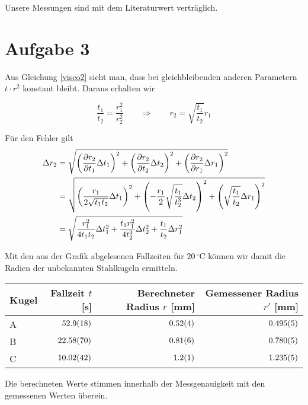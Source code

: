 \documentclass[a4paper,german,12pt,smallheadings]{scrartcl}
\begin{document}
Unsere Messungen sind mit dem Literaturwert verträglich.

\section*{Aufgabe 3}

Aus Gleichung \ref{visco2} sieht man, dass bei gleichbleibenden anderen
Parametern $t \cdot r^2$ konstant bleibt. Daraus erhalten wir

\begin{equation}
  \frac{t_1}{t_2} = \frac{r_1^2}{r_2^2} \qquad \Rightarrow \qquad r_2 = \sqrt{\frac{t_1}{t_2}} r_1
\end{equation}

Für den Fehler gilt
\begin{align*}
  \Delta r_2 &= \sqrt{
    \del{\frac{\partial r_2}{\partial t_1} \Delta t_1}^2 +
    \del{\frac{\partial r_2}{\partial t_2} \Delta t_2}^2 +
    \del{\frac{\partial r_2}{\partial r_1} \Delta r_1}^2
  } \\
  &= \sqrt{
    \del{ \frac{r_1}{2 \sqrt{t_1 t_2}} \Delta t_1 }^2 +
    \del{ -\frac{r_1}{2} \sqrt{ \frac{t_1}{t_2^3}} \Delta t_2 }^2 +
    \del{ \sqrt{ \frac{t_1}{t_2}} \Delta r_1 }^2
  } \\
  &= \sqrt{
    \frac{r_1^2}{4 t_1 t_2} \Delta t_1^2 + \frac{t_1 r_1^2}{4 t_2^3} \Delta t_2^2 + \frac{t_1}{t_2} \Delta r_1^2
  }
\end{align*}

Mit den aus der Grafik abgelesenen Fallzeiten für $20\,^{\circ} \mathrm{C}$
können wir damit die Radien der unbekannten Stahlkugeln ermitteln.

\vspace{0.5cm}
\begin{tabular}{l|r|r|r}
  Kugel & Fallzeit $t$ [s] & Berechneter Radius $r$ [mm] & Gemessener Radius $r'$ [mm] \\
  \hline
  A & $\num{52.9+-1.8}$   & $\num{0.52+-0.04}$ & $\num{0.495+-0.005}$ \\
  B & $\num{22.58+-0.70}$ & $\num{0.81+-0.06}$ & $\num{0.780+-0.005}$ \\
  C & $\num{10.02+-0.42}$ & $\num{1.2+-0.1}$   & $\num{1.235+-0.005}$ \\
\end{tabular}
\vspace{0.5cm}

Die berechneten Werte stimmen innerhalb der Messgenauigkeit mit den
gemessenen Werten überein.
\end{document}
